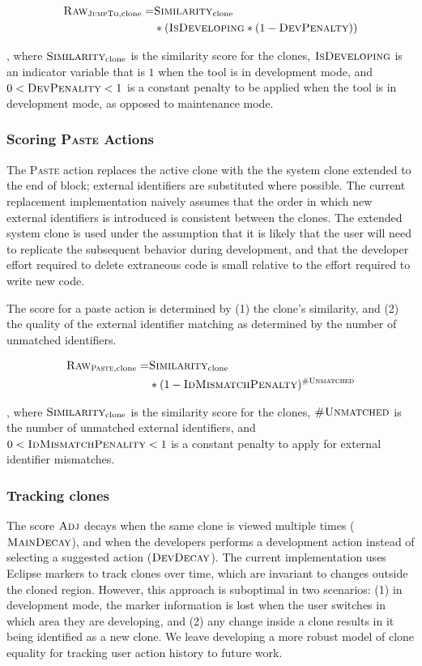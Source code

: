 \documentclass[nocopyrightspace,10pt]{sigplanconf}
\begin{document}
\begin{align*}
  \textsc{Raw}_{\textsc{JumpTo}, \text{clone}} = & \textsc{Similarity}_{\text{clone}} \\ 
   & * (\textsc{IsDeveloping} * (1 - \textsc{DevPenalty}))
\end{align*}

\noindent, where $\textsc{Similarity}_{\text{clone}}$ is the
similarity score for the clones, $\textsc{IsDeveloping}$ is an
indicator variable that is $1$ when the tool is in development mode,
and $0 < \textsc{DevPenality} < 1$ is a constant penalty to be applied
when the tool is in development mode, as opposed to maintenance mode.

\subsubsection{Scoring \textsc{Paste} Actions}
The \textsc{Paste} action replaces the active clone with the the
system clone extended to the end of block; external identifiers are
substituted where possible. The current replacement implementation
naively assumes that the order in which new external identifiers is
introduced is consistent between the clones.  The extended system
clone is used under the assumption that it is likely that the user
will need to replicate the subsequent behavior during development, and
that the developer effort required to delete extraneous code is small
relative to the effort required to write new code.

The score for a paste action is determined by (1) the clone's
similarity, and (2) the quality of the external identifier matching as
determined by the number of unmatched identifiers.

\begin{align*}
  \textsc{Raw}_{\textsc{Paste}, \text{clone}} = & \textsc{Similarity}_{\text{clone}} \\ 
   & * (1 - \textsc{IdMismatchPenalty})^{\textsc{\#Unmatched}}
\end{align*}

\noindent, where $\textsc{Similarity}_{\text{clone}}$ is the
similarity score for the clones, $\textsc{\#Unmatched}$ is the number
of unmatched external identifiers, and $0 <
\textsc{IdMismatchPenality} < 1$ is a constant penalty to apply for
external identifier mismatches.

\subsubsection{Tracking clones}
The score $\textsc{Adj}$ decays when the same clone is viewed multiple
times ($\textsc{MainDecay}$), and when the developers performs a
development action instead of selecting a suggested action ($\textsc{DevDecay}$).
The current implementation uses
Eclipse markers to track clones over time, which are invariant to 
changes outside the cloned region.  
However, this approach is suboptimal in two scenarios:
(1) in development mode, the marker information is lost when the user
switches in which area they are developing, and
(2) any change inside a clone results in it being identified as a new clone.
We leave developing a more robust model of clone equality
for tracking user action history to future work.
\end{document}
